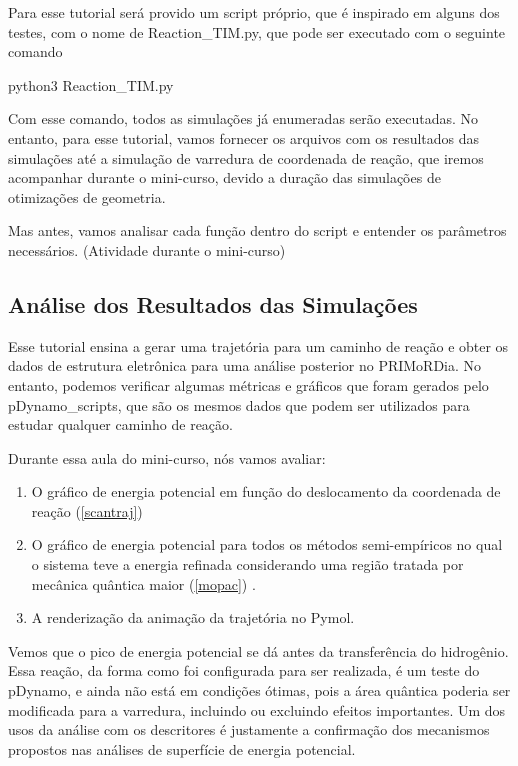 \documentclass[a4paper,11pt]{refart}
\begin{document}
 Para esse tutorial será provido um script próprio, que é inspirado em alguns dos testes, com o nome de Reaction\_TIM.py, que pode ser executado com o seguinte comando 
	
	
	\hspace*{-\leftmarginwidth}
	\begin{minipage}{\fullwidth}
		\begin{commandshell}python3 Reaction\_TIM.py\end{commandshell}
	\end{minipage}

	Com esse comando, todos as simulações já enumeradas serão executadas. No entanto, para esse tutorial, vamos fornecer os arquivos com os resultados das simulações até a simulação de varredura de coordenada de reação, que iremos acompanhar durante o mini-curso, devido a duração das simulações de otimizações de geometria. 
	
	Mas antes, vamos analisar cada função dentro do script e entender os parâmetros necessários. (Atividade durante o mini-curso)
	
	
	\subsection{Análise dos Resultados das Simulações}
	
	Esse tutorial ensina a gerar uma trajetória para um caminho de reação e obter os dados de estrutura eletrônica para uma análise posterior no PRIMoRDia. No entanto, podemos verificar algumas métricas e gráficos que foram gerados pelo pDynamo\_scripts, que são os mesmos dados que podem ser utilizados para estudar qualquer caminho de reação. 
	
	Durante essa aula do mini-curso, nós vamos avaliar:
	
	\begin{enumerate}
		\item O gráfico de energia potencial em função do deslocamento da coordenada de reação (\autoref{scantraj})
		\item O gráfico de energia potencial para todos os métodos semi-empíricos no qual o sistema teve a energia refinada considerando uma região tratada por mecânica quântica maior (\autoref{mopac}) .
		\item A renderização da animação da trajetória no Pymol.
	\end{enumerate}
	
	Vemos que o pico de energia potencial se dá antes da transferência do hidrogênio. Essa reação, da forma como foi configurada para ser realizada, é um teste do pDynamo, e ainda não está em condições ótimas, pois a área quântica poderia ser modificada para a varredura, incluindo ou excluindo efeitos importantes. Um dos usos da análise com os descritores é justamente a confirmação dos mecanismos propostos nas análises de superfície de energia potencial.
	
\end{document}
